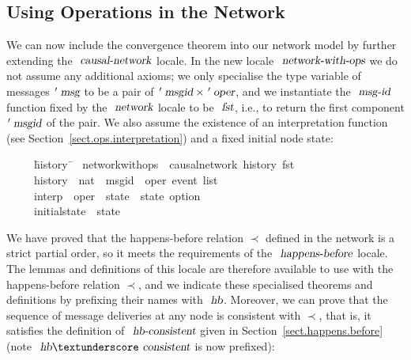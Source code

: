 \subsection{Using Operations in the Network}\label{sect.network.ops}

We can now include the convergence theorem into our network model by further extending the $\isa{causal-network}$ locale.
In the new locale $\isa{network-with-ops}$ we do not assume any additional axioms; we only specialise the type variable of messages $\isacharprime\isa{msg}$ to be a pair of $\isacharprime\isa{msgid} \mathbin{\isasymtimes} \isacharprime\isa{oper}$, and we instantiate the $\isa{msg-id}$ function fixed by the $\isa{network}$ locale to be $\isa{fst}$, i.e., to return the first component $\isacharprime\isa{msgid}$ of the pair.
We also assume the existence of an interpretation function (see Section~\ref{sect.ops.interpretation}) and a fixed initial node state:
\begin{isabelle}
~~~~\ \=history\ \=\kill
{}\ network{\isacharunderscore}with{\isacharunderscore}ops\ {\isacharequal}\ causal{\isacharunderscore}network\ history\ fst\\
~~~~\ \>history\ \>{\isacharcolon}{\isacharcolon}\ {\isachardoublequoteopen}nat\ {\isasymRightarrow}\ {\isacharparenleft}{\isacharprime}msgid\ {\isasymtimes}\ {\isacharprime}oper{\isacharparenright}\ event\ list{\isachardoublequoteclose}\ {\isacharplus}\\
~~~~\ \>interp\ \>{\isacharcolon}{\isacharcolon}\ {\isachardoublequoteopen}{\isacharprime}oper\ {\isasymRightarrow}\ {\isacharprime}state\ {\isasymRightarrow}\ {\isacharprime}state\ option{\isachardoublequoteclose}\\
~~~~\ \>initial{\isacharunderscore}state\ {\isacharcolon}{\isacharcolon}\ {\isachardoublequoteopen}{\isacharprime}state{\isachardoublequoteclose}
\end{isabelle}
We have proved that the happens-before relation $\prec$ defined in the network is a strict partial order, so it meets the requirements of the $\isa{happens-before}$ locale.
The lemmas and definitions of this locale are therefore available to use with the happens-before relation $\prec$, and we indicate these specialised theorems and definitions by prefixing their names with $\isa{hb}$.
Moreover, we can prove that the sequence of message deliveries at any node is consistent with $\prec$, that is, it satisfies the definition of $\isa{hb-consistent}$ given in Section~\ref{sect.happens.before} (note $\isa{hb}{\isacharunderscore}\isa{consistent}$ is now prefixed):
